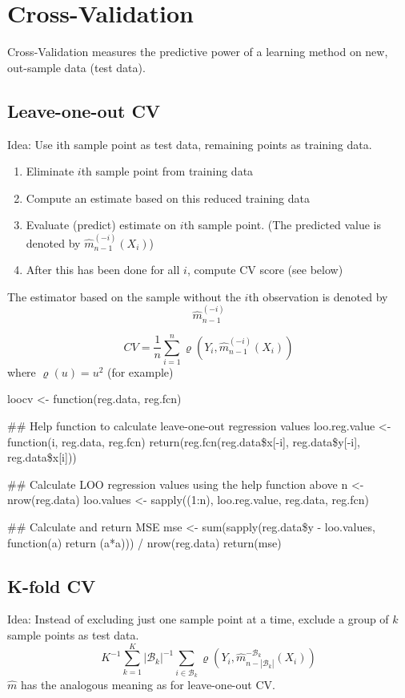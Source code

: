\section{Cross-Validation}
Cross-Validation measures the predictive power of a learning method on new, out-sample data (test data).
\subsection{Leave-one-out CV}
\begin{theory}
 Idea: Use ith sample point as test data, remaining points as training data.
 \begin{enumerate}
  \item Eliminate $i$th sample point from training data
  \item Compute an estimate based on this reduced training data
  \item Evaluate (predict) estimate on $i$th sample point. (The predicted value is denoted by $\hat{m}_{n-1}^{(-i)}(X_i)$)
  \item After this has been done for all $i$, compute CV score (see below)
 \end{enumerate}
 The estimator based on the sample without the $i$th observation is denoted by
 \begin{equation*}
  \hat{m}_{n-1}^{(-i)}
 \end{equation*}

 \begin{equation}
  CV = \frac{1}{n} \sum_{i=1}^n\varrho \left( Y_i, \hat{m}_{n-1}^{(-i)}(X_i)  \right)
  \label{eq:leave_one_out_cv}
 \end{equation}
 where $\varrho(u) = u^2$ (for example)
\end{theory}
\begin{code}
loocv <- function(reg.data, reg.fcn)
{
  ## Help function to calculate leave-one-out regression values
  loo.reg.value <- function(i, reg.data, reg.fcn)
    return(reg.fcn(reg.data\$x[-i], reg.data\$y[-i], reg.data\$x[i]))
  
  ## Calculate LOO regression values using the help function above
  n <- nrow(reg.data)
  loo.values <- sapply((1:n), loo.reg.value, reg.data, reg.fcn)
  
  ## Calculate and return MSE
  mse <- sum(sapply(reg.data\$y - loo.values, function(a) return (a*a))) / nrow(reg.data)
  return(mse)
}
\end{code}

\subsection{K-fold CV}
\begin{theory}
 Idea: Instead of excluding just one sample point at a time, exclude a group of $k$ sample points as test data.
 \begin{equation*}
  K^{-1} \sum_{k=1}^K |\mathcal{B}_k|^{-1} \sum_{i\in\mathcal{B}_k} \varrho \left( Y_i, \hat{m}_{n-|\mathcal{B}_k|}^{-\mathcal{B}_k} (X_i) \right)
 \end{equation*}
 $\hat{m}$ has the analogous meaning as for leave-one-out CV.
\end{theory}


